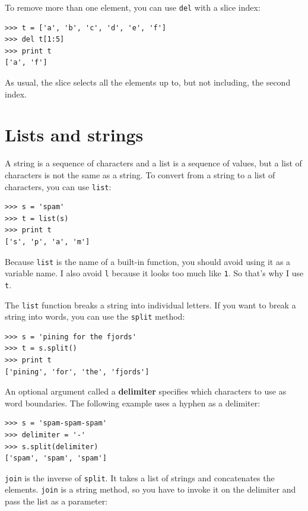 \documentclass[10pt]{book}
\begin{document}

To remove more than one element, you can use {\tt del} with
a slice index:

\beforeverb
\begin{verbatim}
>>> t = ['a', 'b', 'c', 'd', 'e', 'f']
>>> del t[1:5]
>>> print t
['a', 'f']
\end{verbatim}
\afterverb
%
As usual, the slice selects all the elements up to, but not
including, the second index.


\section{Lists and strings}


A string is a sequence of characters and a list is a sequence
of values, but a list of characters is not the same as a
string.  To convert from a string to a list of characters,
you can use {\tt list}:


\beforeverb
\begin{verbatim}
>>> s = 'spam'
>>> t = list(s)
>>> print t
['s', 'p', 'a', 'm']
\end{verbatim}
\afterverb
%
Because {\tt list} is the name of a built-in function, you should
avoid using it as a variable name.  I also avoid {\tt l} because
it looks too much like {\tt 1}.  So that's why I use {\tt t}.

The {\tt list} function breaks a string into individual letters.  If
you want to break a string into words, you can use the {\tt split}
method:


\beforeverb
\begin{verbatim}
>>> s = 'pining for the fjords'
>>> t = s.split()
>>> print t
['pining', 'for', 'the', 'fjords']
\end{verbatim}
\afterverb
%
An optional argument called a {\bf delimiter} specifies which
characters to use as word boundaries.
The following example
uses a hyphen as a delimiter:


\beforeverb
\begin{verbatim}
>>> s = 'spam-spam-spam'
>>> delimiter = '-'
>>> s.split(delimiter)
['spam', 'spam', 'spam']
\end{verbatim}
\afterverb
%
{\tt join} is the inverse of {\tt split}.  It
takes a list of strings and
concatenates the elements.  {\tt join} is a string method,
so you have to invoke it on the delimiter and pass the
list as a parameter:
\end{document}
